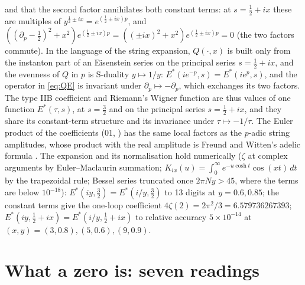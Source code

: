 \documentclass[11pt]{article}
\theoremstyle{definition}\newtheorem{definition}[theorem]{Definition}
\theoremstyle{remark}\newtheorem{remark}[theorem]{Remark}
\begin{document}
and that the second factor annihilates both constant terms: at $s=\frac12+ix$ these are multiples of $y^{\frac12\pm ix}=e^{(\frac12\pm ix)p}$, and $((\partial_p-\frac12)^2+x^2)e^{(\frac12\pm ix)p}=((\pm ix)^2+x^2)e^{(\frac12\pm ix)p}=0$ (the two factors commute). In the language of the string expansion, $Q(\cdot,x)$ is built only from the instanton part of an Eisenstein series on the principal series $s=\frac12+ix$, and the evenness of $Q$ in $p$ is S-duality $y\mapsto1/y$: $E^*(ie^{-p},s)=E^*(ie^p,s)$, and the operator in \eqref{eq:QE} is invariant under $\partial_p\mapsto-\partial_p$, which exchanges its two factors. The type IIB coefficient and Riemann's Wigner function are thus values of one function $E^*(\tau,s)$, at $s=\frac32$ and on the principal series $s=\frac12+ix$, and they share its constant-term structure and its invariance under $\tau\mapsto-1/\tau$. The Euler product of the coefficients (01, \cite{SMath}) has the same local factors as the $p$-adic string amplitudes, whose product with the real amplitude is Freund and Witten's adelic formula \cite{FreundWitten}. The expansion and its normalisation hold numerically ($\zeta$ at complex arguments by Euler--Maclaurin summation; $K_{ix}(u)=\int_0^\infty e^{-u\cosh t}\cos(xt)\,dt$ by the trapezoidal rule; Bessel series truncated once $2\pi Ny>45$, where the terms are below $10^{-18}$): $E^*(iy,\frac32)=E^*(i/y,\frac32)$ to 13 digits at $y=0.6,0.85$; the constant terms give the one-loop coefficient $4\zeta(2)=2\pi^2/3=6.579736267393$; $E^*(iy,\frac12+ix)=E^*(i/y,\frac12+ix)$ to relative accuracy $5\times10^{-14}$ at $(x,y)=(3,0.8),(5,0.6),(9,0.9)$.

\section{What a zero is: seven readings}\label{sec:zero}
\end{document}
